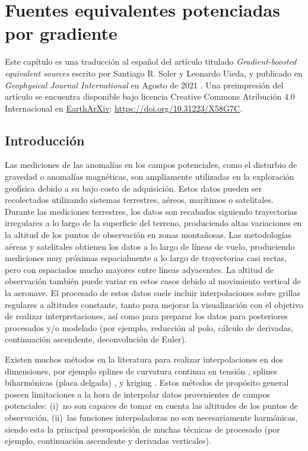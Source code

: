 \chapter[Fuentes equivalentes potenciadas por gradiente]{
    Fuentes equivalentes potenciadas por gradiente
}
\label{cha:eql-gradient-boosted}

Este capítulo es una traducción al español del artículo titulado
\emph{Gradient-boosted equivalent sources} escrito por Santiago R. Soler
y Leonardo Uieda, y publicado en \emph{Geophysical Journal
International} en Agosto de 2021 \citep{soler2021}.
Una preimpresión del artículo se encuentra disponible bajo licencia Creative
Commons Atribución 4.0 Internacional en
\href{https://eartharxiv.org/}{EarthArXiv}:
\url{https://doi.org/10.31223/X58G7C}.





\section{Introducción}

Las mediciones de las anomalías en los campos potenciales, como el disturbio de
gravedad o anomalías magnéticas, son ampliamente utilizadas en la exploración
geofísica debido a su bajo costo de adquisición.
Estos datos pueden ser recolectados utilizando sistemas terrestres, aéreos,
marítimos o satelitales.
Durante las mediciones terrestres, los datos son recabados siguiendo
trayectorias irregulares a lo largo de la superficie del terreno, produciendo
altas variaciones en la altitud de los puntos de observación en zonas
montañosas.
Las metodologías aéreas y satelitales obtienen los datos a lo largo de líneas
de vuelo, produciendo mediciones muy próximas espacialmente a lo largo de
trayectorias casi rectas, pero con espaciados mucho mayores entre líneas
adyacentes.
La altitud de observación también puede variar en estos casos debido al
movimiento vertical de la aeronave.
El procesado de estos datos suele incluir interpolaciones sobre grillas
regulares a altitudes constante, tanto para mejorar la visualización con el
objetivo de realizar interpretaciones, así como para preparar los datos para
posteriores procesados y/o modelado (por ejemplo, reducción al polo, cálculo de
derivadas, continuación ascendente, deconvolución de Euler).

Existen muchos métodos en la literatura para realizar interpolaciones en dos
dimensiones, por ejemplo splines de curvatura continua en tensión
\citep{smith1990}, splines biharmónicas (placa delgada) \citep{sandwell1987},
y kriging \citep{hansen1993}.
Estos métodos de propósito general poseen limitaciones a la hora de interpolar
datos provenientes de campos potenciales:
(i)~no son capaces de tomar en cuenta las altitudes de los puntos de
observación,
(ii)~las funciones interpoladoras no son necesariamente harmónicas, siendo esta
la principal presuposición de muchas técnicas de procesado (por ejemplo,
continuación ascendente y derivadas verticales).

